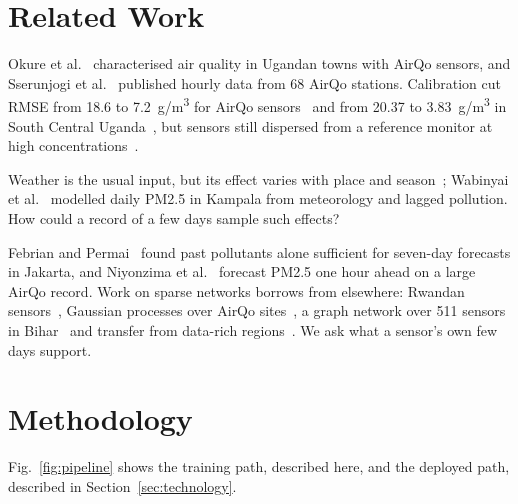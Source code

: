 \documentclass{ieeeaccess}
\newcommand{\ugm}{\textmu g/m\textsuperscript{3}}
\begin{document}
\section{Related Work}\label{sec:related}

Okure et al.~\cite{ref02} characterised air quality in Ugandan towns with AirQo sensors, and Sserunjogi et al.~\cite{ref03} published hourly data from 68 AirQo stations. Calibration cut RMSE from 18.6 to 7.2~\ugm{} for AirQo sensors~\cite{ref04} and from 20.37 to 3.83~\ugm{} in South Central Uganda~\cite{ref24}, but sensors still dispersed from a reference monitor at high concentrations~\cite{ref05}.

Weather is the usual input, but its effect varies with place and season~\cite{ref07,ref08}; Wabinyai et al.~\cite{ref09} modelled daily PM2.5 in Kampala from meteorology and lagged pollution. How could a record of a few days sample such effects?

Febrian and Permai~\cite{ref06} found past pollutants alone sufficient for seven-day forecasts in Jakarta, and Niyonzima et al.~\cite{ref10} forecast PM2.5 one hour ahead on a large AirQo record. Work on sparse networks borrows from elsewhere: Rwandan sensors~\cite{ref25}, Gaussian processes over AirQo sites~\cite{ref26}, a graph network over 511 sensors in Bihar~\cite{ref27} and transfer from data-rich regions~\cite{ref28}. We ask what a sensor's own few days support.

\section{Methodology}\label{sec:method}

Fig.~\ref{fig:pipeline} shows the training path, described here, and the deployed path, described in Section~\ref{sec:technology}.
\end{document}

